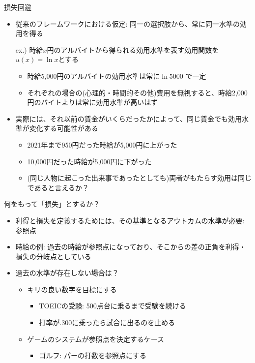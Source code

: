 \documentclass[dvipdfmx,11pt]{beamer}
\begin{document}
\begin{frame}{損失回避}
  \begin{itemize}
    \item 従来のフレームワークにおける仮定: 同一の選択肢から、常に同一水準の効用を得る
    \item[ex.)] 時給$x$円のアルバイトから得られる効用水準を表す効用関数を$u(x) = \ln x$とする
    \begin{itemize}
      \item 時給5,000円のアルバイトの効用水準は常に$\ln 5000$ で一定
      \item それぞれの場合の(心理的・時間的その他)費用を無視すると、時給2,000円のバイトよりは常に効用水準が高いはず
    \end{itemize} 
    \item 実際には、それ以前の賃金がいくらだったかによって、同じ賃金でも効用水準が変化する可能性がある
    \begin{itemize}
      \item 2021年まで950円だった時給が5,000円に上がった
      \item 10,000円だった時給が5,000円に下がった
      \item (同じ人物に起こった出来事であったとしても)両者がもたらす効用は同じであると言えるか？
    \end{itemize}
  \end{itemize}
\end{frame}

\begin{frame}{何をもって「損失」とするか？}
  \begin{itemize}
    \item 利得と損失を定義するためには、その基準となるアウトカムの水準が必要: 参照点
    \item 時給の例: 過去の時給が参照点になっており、そこからの差の正負を利得・損失の分岐点としている
    \item 過去の水準が存在しない場合は？
    \begin{itemize}
      \item キリの良い数字を目標にする
      \begin{itemize}
        \item TOEICの受験: 500点台に乗るまで受験を続ける
        \item 打率が.300に乗ったら試合に出るのを止める
      \end{itemize}
      \item ゲームのシステムが参照点を決定するケース
      \begin{itemize}
        \item ゴルフ: パーの打数を参照点にする
      \end{itemize}
    \end{itemize}
  \end{itemize}
\end{frame}
\end{document}
